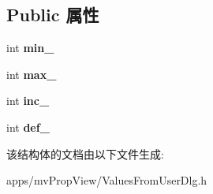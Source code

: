 \subsection*{Public 属性}
\begin{DoxyCompactItemize}
\item 
\hypertarget{struct_value_range_data_a52ea03a1ecffb368ed085c352ed5b391}{int {\bfseries min\+\_\+}}\label{struct_value_range_data_a52ea03a1ecffb368ed085c352ed5b391}

\item 
\hypertarget{struct_value_range_data_a8e1f610ee0ded3b9377823204c108c94}{int {\bfseries max\+\_\+}}\label{struct_value_range_data_a8e1f610ee0ded3b9377823204c108c94}

\item 
\hypertarget{struct_value_range_data_aa8c32cdbe1c7852a98102907a50bb790}{int {\bfseries inc\+\_\+}}\label{struct_value_range_data_aa8c32cdbe1c7852a98102907a50bb790}

\item 
\hypertarget{struct_value_range_data_a40b498d159135a6a00962008fbacac1e}{int {\bfseries def\+\_\+}}\label{struct_value_range_data_a40b498d159135a6a00962008fbacac1e}

\end{DoxyCompactItemize}


该结构体的文档由以下文件生成\+:\begin{DoxyCompactItemize}
\item 
apps/mv\+Prop\+View/Values\+From\+User\+Dlg.\+h\end{DoxyCompactItemize}
